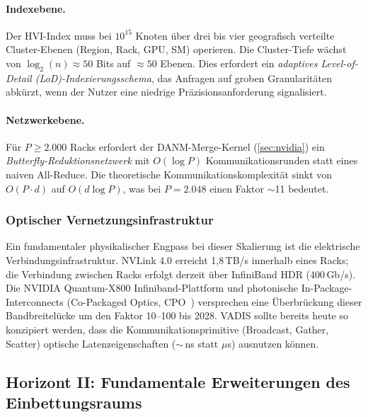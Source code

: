 ﻿\documentclass[12pt,a4paper]{article}
\begin{document}
\paragraph{Indexebene.}
Der HVI-Index muss bei $10^{15}$ Knoten über drei bis vier
geografisch verteilte Cluster-Ebenen (Region, Rack, GPU, SM)
operieren. Die Cluster-Tiefe wächst von $\log_2(n) \approx 50$
Bits auf $\approx 50$ Ebenen. Dies erfordert ein
\emph{adaptives Level-of-Detail (LoD)-Indexierungsschema},
das Anfragen auf groben Granularitäten abkürzt, wenn der
Nutzer eine niedrige Präzisionsanforderung signalisiert.

\paragraph{Netzwerkebene.}
Für $P \geq 2.000$ Racks erfordert der DANM-Merge-Kernel
(\cref{sec:nvidia}) ein \emph{Butterfly-Reduktionsnetzwerk}
mit $O(\log P)$ Kommunikationsrunden statt eines
naiven All-Reduce. Die theoretische Kommunikationskomplexität
sinkt von $O(P \cdot d)$ auf $O(d \log P)$, was bei
$P = 2.048$ einen Faktor $\sim$11 bedeutet.

\subsubsection{Optischer Vernetzungsinfrastruktur}

Ein fundamentaler physikalischer Engpass bei dieser
Skalierung ist die elektrische Verbin\-dungsinfrastruktur.
NVLink 4.0 erreicht 1,8\,TB/s innerhalb eines Racks;
die Verbindung zwischen Racks erfolgt derzeit über
InfiniBand HDR (400\,Gb/s). Die NVIDIA Quantum-X800
Infiniband-Plattform und photonische In-Package-Interconnects
(Co-Packaged Optics, CPO~\cite{thraskias2018survey}) versprechen
eine Überbrückung dieser Bandbreitelücke um den Faktor 10--100
bis 2028. VADIS sollte bereits heute so konzipiert werden, dass
die Kommunikationsprimitive (Broadcast, Gather, Scatter)
optische Latenzeigenschaften ($\sim$\,ns statt $\mu$s) ausnutzen
können.

\subsection{Horizont II: Fundamentale Erweiterungen des
            Einbettungsraums}
\label{sub:horizont2}
\end{document}
